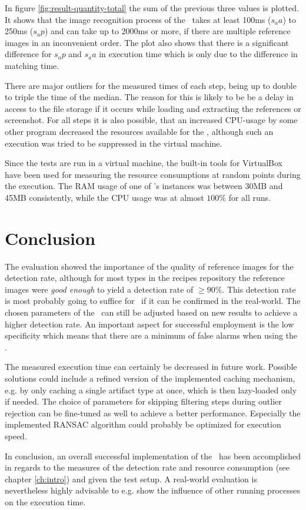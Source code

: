 In figure \ref{fig:result-quantity-total} the sum of the previous three values is plotted. It shows that the image recognition process of the \vd~takes at least 100ms ($s_aa$) to 250ms ($s_ap$) and can take up to 2000ms or more, if there are multiple reference images in an inconvenient order. The plot also shows that there is a significant difference for $s_ap$ and $s_aa$ in execution time which is only due to the difference in matching time.

There are major outliers for the measured times of each step, being up to double to triple the time of the median. The reason for this is likely to be be a delay in access to the file storage if it occurs while loading and extracting the references or screenshot. For all steps it is also possible, that an increased CPU-usage by some other program decreased the resources available for the \vd, although such an execution was tried to be suppressed in the virtual machine.

Since the tests are run in a virtual machine, the built-in tools for VirtualBox have been used for measuring the resource consumptions at random points during the execution. The RAM usage of one of \vd's instances was between 30MB and 45MB consistently, while the CPU usage was at almost $100\%$ for all runs.

\chapter{Conclusion}\label{ch:conclusion}

The evaluation showed the importance of the quality of reference images for the detection rate, although for most types in the recipes repository the reference images were \emph{good enough} to yield a detection rate of $\geq90\%$. This detection rate is most probably going to suffice for \ape~if it can be confirmed in the real-world. The chosen parameters of the \vd~can still be adjusted based on new results to achieve a higher detection rate. An important aspect for successful employment is the low specificity which means that there are a minimum of false alarms when using the \vd.

The measured execution time can certainly be decreased in future work. Possible solutions could include a refined version of the implemented caching mechanism, e.g. by only caching a single artifact type at once, which is then lazy-loaded only if needed. The choice of parameters for skipping filtering steps during outlier rejection can be fine-tuned as well to achieve a better performance. Especially the implemented RANSAC algorithm could probably be optimized for execution speed.

In conclusion, an overall successful implementation of the \vd~has been accomplished in regards to the measures of the detection rate and resource consumption (see chapter \ref{ch:intro}) and given the test setup. A real-world evaluation is nevertheless highly advisable to e.g. show the influence of other running processes on the execution time.
